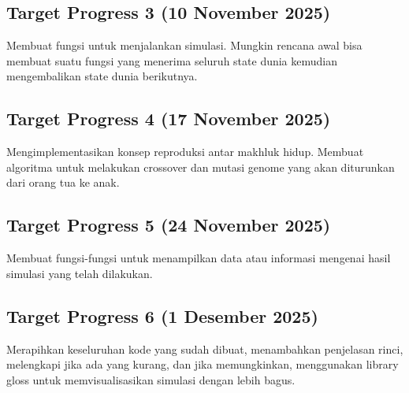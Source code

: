 \documentclass[12pt]{article}
\begin{document}
\subsection{Target Progress 3 (10 November 2025)}
Membuat fungsi untuk menjalankan simulasi. Mungkin rencana awal bisa membuat suatu fungsi yang menerima seluruh state dunia kemudian mengembalikan state dunia berikutnya. 
\subsection{Target Progress 4 (17 November 2025)}
Mengimplementasikan konsep reproduksi antar makhluk hidup. Membuat algoritma untuk melakukan crossover dan mutasi genome yang akan diturunkan dari orang tua ke anak.
\subsection{Target Progress 5 (24 November 2025)}
Membuat fungsi-fungsi untuk menampilkan data atau informasi mengenai hasil simulasi yang telah dilakukan.
\subsection{Target Progress 6 (1 Desember 2025)}
Merapihkan keseluruhan kode yang sudah dibuat, menambahkan penjelasan rinci, melengkapi jika ada yang kurang, dan jika memungkinkan, menggunakan library gloss untuk memvisualisasikan simulasi dengan lebih bagus.

 
\end{document}
